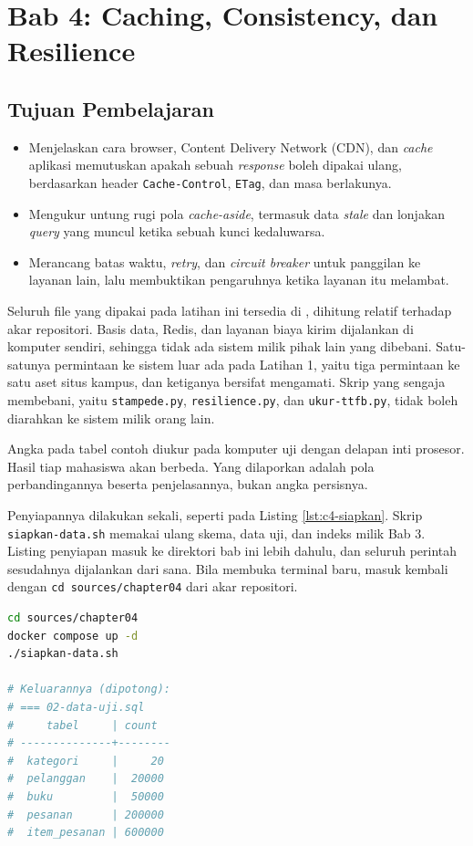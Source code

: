 \section{Bab 4: Caching, Consistency, dan Resilience}

\subsection*{Tujuan Pembelajaran}
\begin{itemize}
  \item Menjelaskan cara browser, Content Delivery Network (CDN), dan
        \textit{cache} aplikasi memutuskan apakah sebuah \textit{response} boleh dipakai
        ulang, berdasarkan header \texttt{Cache-Control}, \texttt{ETag}, dan
        masa berlakunya.
  \item Mengukur untung rugi pola \textit{cache-aside}, termasuk data \textit{stale} dan
        lonjakan \textit{query} yang muncul ketika sebuah kunci kedaluwarsa.
  \item Merancang batas waktu, \textit{retry}, dan \textit{circuit breaker} untuk
        panggilan ke layanan lain, lalu membuktikan pengaruhnya ketika layanan
        itu melambat.
\end{itemize}

Seluruh file yang dipakai pada latihan ini tersedia di
, dihitung relatif terhadap akar repositori. Basis
data, Redis, dan layanan biaya kirim dijalankan di komputer sendiri, sehingga
tidak ada sistem milik pihak lain yang dibebani. Satu-satunya permintaan ke
sistem luar ada pada Latihan 1, yaitu tiga permintaan ke satu aset situs
kampus, dan ketiganya bersifat mengamati. Skrip yang sengaja membebani, yaitu
\texttt{stampede.py}, \texttt{resilience.py}, dan \texttt{ukur-ttfb.py}, tidak
boleh diarahkan ke sistem milik orang lain.

Angka pada tabel contoh diukur pada komputer uji dengan delapan inti prosesor.
Hasil tiap mahasiswa akan berbeda. Yang dilaporkan adalah pola perbandingannya
beserta penjelasannya, bukan angka persisnya.

Penyiapannya dilakukan sekali, seperti pada Listing \ref{lst:c4-siapkan}.
Skrip \texttt{siapkan-data.sh} memakai ulang skema, data uji, dan indeks
milik Bab 3. Listing penyiapan masuk ke direktori bab ini lebih dahulu, dan
seluruh perintah sesudahnya dijalankan dari sana. Bila membuka terminal baru,
masuk kembali dengan \texttt{cd sources/chapter04} dari akar repositori.

\begin{lstlisting}[language=bash, caption={Menyiapkan basis data dan Redis, memakai \berkas{sources/chapter04/siapkan-data.sh}}, label={lst:c4-siapkan}]
cd sources/chapter04
docker compose up -d
./siapkan-data.sh

# Keluarannya (dipotong):
# === 02-data-uji.sql
#     tabel     | count
# --------------+--------
#  kategori     |     20
#  pelanggan    |  20000
#  buku         |  50000
#  pesanan      | 200000
#  item_pesanan | 600000
\end{lstlisting}

